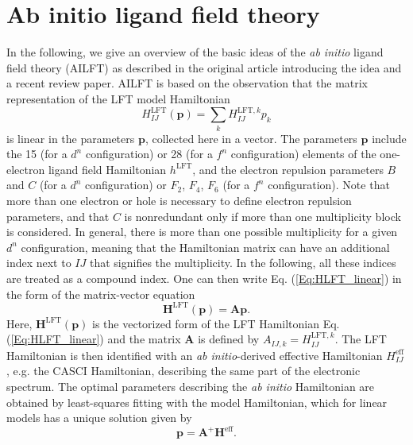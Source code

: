 \section{Ab initio ligand field theory}
\label{Sec:AILFT_theory}
In the following, we give an overview of the basic ideas of the \textit{ab initio} ligand field theory (AILFT) as described in the original article introducing the idea\cite{AtanaGSN_2012_149} and a recent review paper.\cite{SinghEAN_2017_2}
AILFT is based on the observation that the matrix representation of the LFT model Hamiltonian
\begin{equation}
\label{Eq:HLFT_linear}
H_{IJ}^{{\text{LFT}}}({\mathbf{p}}) = \sum\limits_k {H_{IJ}^{{\text{LFT}},k}} {p_k}
\end{equation}
is linear in the parameters $\mathbf{p}$, collected here in a vector. The parameters ${\mathbf{p}}$ include the 15 (for a $d^n$ configuration) or 28 (for a $f^n$ configuration) elements of the one-electron ligand field Hamiltonian $h^\text{LFT}$, and the electron repulsion parameters $B$ and $C$ (for a $d^n$ configuration) or $F_2$, $F_4$, $F_6$ (for a $f^n$ configuration). Note that more than one electron or hole is necessary to define electron repulsion parameters, and that $C$ is nonredundant only if more than one multiplicity block is considered. In general, there is more than one possible multiplicity for a given $d^n$ configuration, meaning that the Hamiltonian matrix can have an additional index next to $IJ$ that signifies the multiplicity. In the following, all these indices are treated as a compound index. One can then write Eq. (\ref{Eq:HLFT_linear}) in the form of the matrix-vector equation
\begin{equation}
\mathbf{H}^\text{LFT}(\mathbf{p}) = \mathbf{A} \mathbf{p}.
\end{equation}
Here, $\mathbf{H}^\text{LFT}(\mathbf{p})$ is the vectorized form of the LFT Hamiltonian Eq. (\ref{Eq:HLFT_linear}) and the matrix $\mathbf{A}$ is defined by ${A_{IJ,k}} = H_{IJ}^{{\text{LFT}},k}$.
The LFT Hamiltonian is then identified with an \textit{ab initio}-derived effective Hamiltonian $H_{IJ}^{{\text{eff}}}$, e.g. the CASCI Hamiltonian, describing the same part of the electronic spectrum. The optimal parameters describing the \textit{ab initio} Hamiltonian are obtained by least-squares fitting with the model Hamiltonian, which for linear models has a unique solution given by\cite{Penro_1956_17}
\begin{equation}
\label{Eq:linearmodel_solution}
{\mathbf{p}} = {{\mathbf{A}}^ + }{{\mathbf{H}}^{{\text{eff}}}}.
\end{equation}
